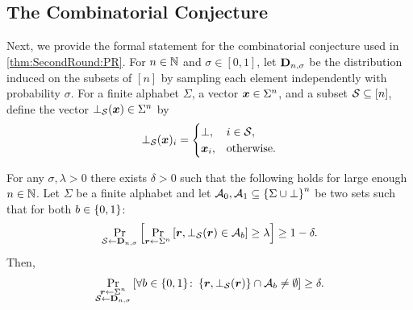 

\subsection{The Combinatorial Conjecture}\label{sec:Iso}
Next, we provide the formal statement for the combinatorial conjecture used in \cref{thm:SecondRound:PR}.
For $n\in {\mathbb{N}}$ and $\sigma \in [0,1]$, let $\mathbf{D}_{n,\sigma}$ be the distribution induced on the subsets of $[n]$ by sampling each element independently with probability $\sigma$.
For a finite alphabet $\Sigma$, a vector ${ \boldsymbol{x}}\in \Sigma^n$, and a subset $\mathcal{S} \subseteq [n]$, define the vector $\bot_{\mathcal{S}}({ \boldsymbol{x}}) \in \Sigma^n$ by
\[
\bot_{\mathcal{S}}({ \boldsymbol{x}})_i=
\begin{cases}
\bot, & i\in {\cal{S}},\\
{ \boldsymbol{x}}_i, & \text{otherwise}.
\end{cases}
\]


\begin{conjecture}\label{con:IsoBot}
For any $\sigma,\lambda >0$ there exists $\delta>0$ such that the following holds for large enough $n\in {\mathbb{N}}$. Let  $\Sigma$ be a finite alphabet and let $\mathcal{A}_0,\mathcal{A}_1 \subseteq \left\{\Sigma \cup \bot\right\}^n$  be  two  sets such that for both $b\in \{0,1\}$:
\begin{align*}%
\ppr{\cs\gets \bns}{\ppr{\vr \gets \Sigma^n}{\vr,\bot_{\cS}(\vr) \in \cA_b} \ge  \lambda } \ge 1-\delta.
\end{align*}
Then,
\begin{align*}%
\ppr{\substack{\vr\gets \Sigma^n\\ \cS \gets \bns}}{\forall b\in \zo\colon  \set{\vr,\bot_{\cS}(\vr)}  \cap \cA_b \neq \emptyset} \ge  \delta.
\end{align*}
\end{conjecture}


